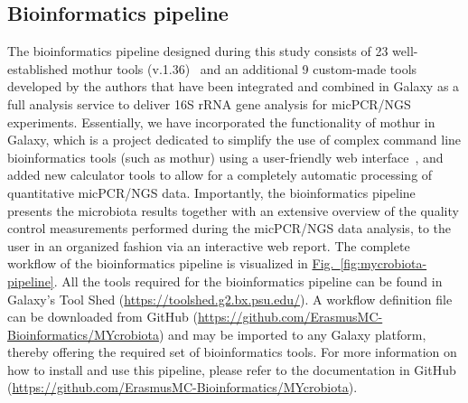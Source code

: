 \subsection*{Bioinformatics pipeline}
The bioinformatics pipeline designed during this study consists of 23 well-established mothur tools (v.1.36)~\cite{schloss2009introducing} and an additional 9 custom-made tools developed by the authors that have been integrated and combined in Galaxy as a full analysis service to deliver 16S rRNA gene analysis for micPCR/NGS experiments. Essentially, we have incorporated the functionality of mothur in Galaxy, which is a project dedicated to simplify the use of complex command line bioinformatics tools (such as mothur) using a user-friendly web interface~\cite{giardine2005galaxy,blankenberg2010galaxy,goecks2010galaxy}, and added new calculator tools to allow for a completely automatic processing of quantitative micPCR/NGS data. Importantly, the bioinformatics pipeline presents the microbiota results together with an extensive overview of the quality control measurements performed during the micPCR/NGS data analysis, to the user in an organized fashion via an interactive web report. The complete workflow of the bioinformatics pipeline is visualized in \hyperref[fig:mycrobiota-pipeline]{Fig.~\ref{fig:mycrobiota-pipeline}}. All the tools required for the bioinformatics pipeline can be found in Galaxy’s Tool Shed (\url{https://toolshed.g2.bx.psu.edu/}). A workflow definition file can be downloaded from GitHub (\url{https://github.com/ErasmusMC-Bioinformatics/MYcrobiota}) and may be imported to any Galaxy platform, thereby offering the required set of bioinformatics tools. For more information on how to install and use this pipeline, please refer to the documentation in GitHub (\url{https://github.com/ErasmusMC-Bioinformatics/MYcrobiota}).

